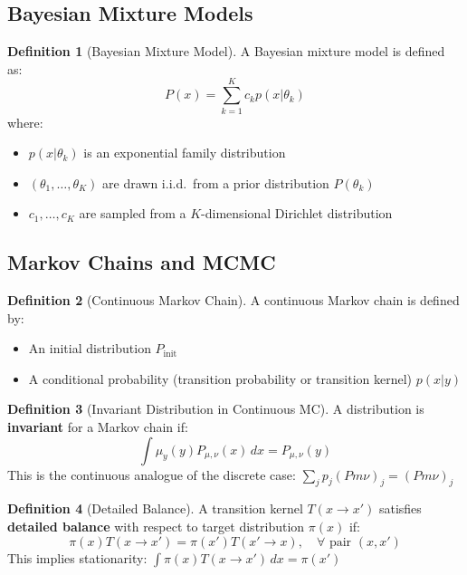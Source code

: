 \documentclass[12pt,a4paper]{article}
\theoremstyle{definition}
\newtheorem{definition}{Definition}[section]
\begin{document}
\subsection{Bayesian Mixture Models}

\begin{definition}[Bayesian Mixture Model]
A Bayesian mixture model is defined as:
\[
P(x) = \sum_{k=1}^K c_k p(x|\theta_k)
\]
where:
\begin{itemize}
    \item $p(x|\theta_k)$ is an exponential family distribution
    \item $(\theta_1, \ldots, \theta_K)$ are drawn i.i.d.\ from a prior distribution $P(\theta_k)$
    \item $c_1, \ldots, c_K$ are sampled from a $K$-dimensional Dirichlet distribution
\end{itemize}
\end{definition}

\subsection{Markov Chains and MCMC}

\begin{definition}[Continuous Markov Chain]
A continuous Markov chain is defined by:
\begin{itemize}
    \item An initial distribution $P_{\text{init}}$
    \item A conditional probability (transition probability or transition kernel) $p(x|y)$
\end{itemize}
\end{definition}

\begin{definition}[Invariant Distribution in Continuous MC]
A distribution is \textbf{invariant} for a Markov chain if:
\[
\int \mu_y(y) P_{\mu,\nu}(x) \, dx = P_{\mu,\nu}(y)
\]
This is the continuous analogue of the discrete case: $\sum_j p_j (Pm\nu)_j = (Pm\nu)_j$
\end{definition}

\begin{definition}[Detailed Balance]
A transition kernel $T(x \to x')$ satisfies \textbf{detailed balance} with respect to target distribution $\pi(x)$ if:
\[
\pi(x) T(x \to x') = \pi(x') T(x' \to x), \quad \forall \text{ pair } (x, x')
\]
This implies stationarity: $\int \pi(x) T(x \to x') \, dx = \pi(x')$
\end{definition}
\end{document}

